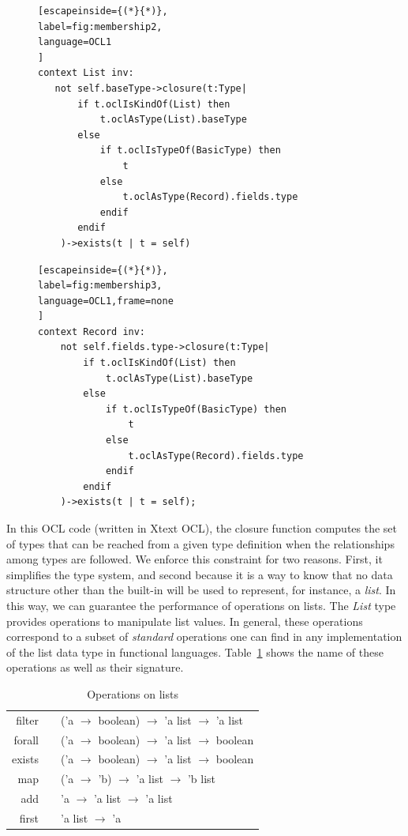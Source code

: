 \begin{figure}[h]
\begin{minipage}[b]{0.44\linewidth}

\begin{lstlisting}[escapeinside={(*}{*)},
label=fig:membership2,
language=OCL1
]
context List inv:
   not self.baseType->closure(t:Type| 
	   if t.oclIsKindOf(List) then
		   t.oclAsType(List).baseType
	   else
		   if t.oclIsTypeOf(BasicType) then
			   t
		   else
			   t.oclAsType(Record).fields.type
		   endif
	   endif
   	)->exists(t | t = self)
\end{lstlisting} 
\end{minipage}
\hspace{0.1\linewidth}
\begin{minipage}[b]{0.44\linewidth}
\begin{lstlisting}[escapeinside={(*}{*)},
label=fig:membership3,
language=OCL1,frame=none
]
context Record inv: 
	not self.fields.type->closure(t:Type|
		if t.oclIsKindOf(List) then
			t.oclAsType(List).baseType
		else
			if t.oclIsTypeOf(BasicType) then
				t
			else
				t.oclAsType(Record).fields.type
			endif
		endif
	)->exists(t | t = self);
\end{lstlisting} 
\end{minipage}
\end{figure}

In this OCL code (written in Xtext OCL), the closure function computes the set of types that can be reached from a given type definition when the relationships among types are followed.
We enforce this constraint for two reasons. First, it simplifies the type system, and second because it is a way to know that no data structure other than the built-in will be used to represent, for instance, a \textit{list}.
In this way, we can guarantee the performance of operations on lists.  
The \textit{List} type provides operations to manipulate list values.
In general, these operations correspond to a subset of \textit{standard} operations one can find in any implementation of the list data type in functional languages.
Table~\ref{tab:operations-on-lists} shows the name of these operations as well as their signature.

\begin{table}[!ht]
\centering
\begin{tabular}{r p{0.5cm} l}
\hline
\hline filter & & ('a $\to$ boolean) $\to$ 'a list $\to$ 'a list \\ 
forall & & ('a $\to$ boolean) $\to$ 'a list $\to$ boolean \\ 
exists & & ('a $\to$ boolean) $\to$ 'a list $\to$ boolean \\ 
map & & ('a $\to$ 'b) $\to$ 'a list $\to$ 'b list \\ 
add & & 'a $\to$ 'a list $\to$ 'a list \\ 
first & & 'a list $\to$ 'a \\
\hline 
\end{tabular} 
\caption{Operations on lists} \label{tab:operations-on-lists}
\end{table} 

